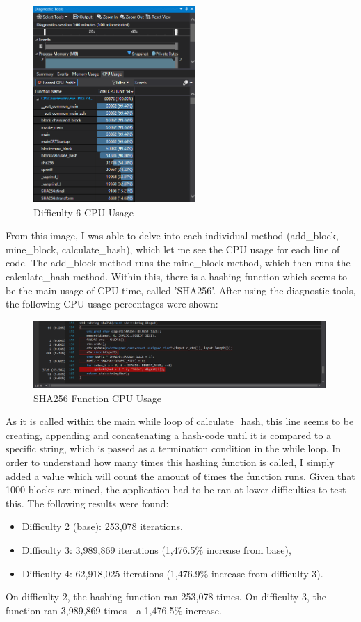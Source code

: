 \documentclass[12pt, a4paper]{article}
\begin{document}
\begin{figure}[H]
	\centering
		\includegraphics[width=0.55\textwidth]{"CPU Usage Diff(6)"}
		\caption{Difficulty 6 CPU Usage}
\end{figure}

From this image, I was able to delve into each individual method (add\_block, mine\_block, calculate\_hash), which let me see the CPU usage for each line of code. The add\_block method runs the mine\_block method, which then runs the calculate\_hash method. Within this, there is a hashing function which seems to be the main usage of CPU time, called 'SHA256'. After using the diagnostic tools, the following CPU usage percentages were shown: \\

\begin{figure}[H]
	\centering
		\includegraphics[width=0.99\textwidth]{"SHA256"}
		\caption{SHA256 Function CPU Usage}
\end{figure}

As it is called within the main while loop of calculate\_hash, this line seems to be creating, appending and concatenating a hash-code until it is compared to a specific string, which is passed as a termination condition in the while loop. In order to understand how many times this hashing function is called, I simply added a value which will count the amount of times the function runs. Given that 1000 blocks are mined, the application had to be ran at lower difficulties to test this. The following results were found:
\begin{itemize}
\item Difficulty 2 (base): 253,078 iterations,
\item Difficulty 3: 3,989,869 iterations (1,476.5\% increase from base),
\item Difficulty 4: 62,918,025 iterations (1,476.9\% increase from difficulty 3).
\end{itemize}
On difficulty 2, the hashing function ran 253,078 times. On difficulty 3, the function ran 3,989,869 times - a 1,476.5\% increase.
\end{document}
